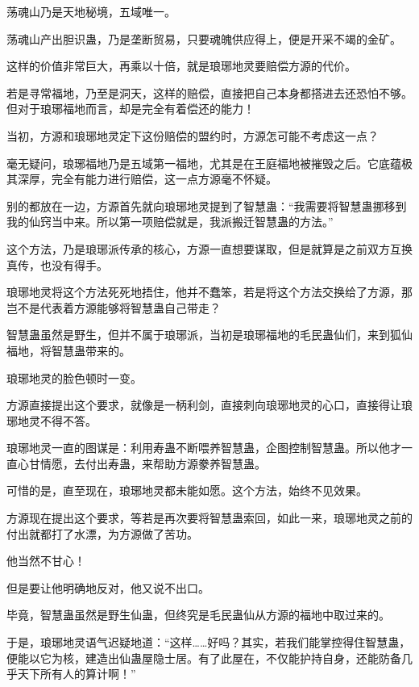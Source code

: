 
\begin{this_body}

荡魂山乃是天地秘境，五域唯一。

荡魂山产出胆识蛊，乃是垄断贸易，只要魂魄供应得上，便是开采不竭的金矿。

这样的价值非常巨大，再乘以十倍，就是琅琊地灵要赔偿方源的代价。

若是寻常福地，乃至是洞天，这样的赔偿，直接把自己本身都搭进去还恐怕不够。但对于琅琊福地而言，却是完全有着偿还的能力！

当初，方源和琅琊地灵定下这份赔偿的盟约时，方源怎可能不考虑这一点？

毫无疑问，琅琊福地乃是五域第一福地，尤其是在王庭福地被摧毁之后。它底蕴极其深厚，完全有能力进行赔偿，这一点方源毫不怀疑。

别的都放在一边，方源首先就向琅琊地灵提到了智慧蛊：“我需要将智慧蛊挪移到我的仙窍当中来。所以第一项赔偿就是，我派搬迁智慧蛊的方法。”

这个方法，乃是琅琊派传承的核心，方源一直想要谋取，但是就算是之前双方互换真传，也没有得手。

琅琊地灵将这个方法死死地捂住，他并不蠢笨，若是将这个方法交换给了方源，那岂不是代表着方源能够将智慧蛊自己带走？

智慧蛊虽然是野生，但并不属于琅琊派，当初是琅琊福地的毛民蛊仙们，来到狐仙福地，将智慧蛊带来的。

琅琊地灵的脸色顿时一变。

方源直接提出这个要求，就像是一柄利剑，直接刺向琅琊地灵的心口，直接得让琅琊地灵不得不答。

琅琊地灵一直的图谋是：利用寿蛊不断喂养智慧蛊，企图控制智慧蛊。所以他才一直心甘情愿，去付出寿蛊，来帮助方源豢养智慧蛊。

可惜的是，直至现在，琅琊地灵都未能如愿。这个方法，始终不见效果。

方源现在提出这个要求，等若是再次要将智慧蛊索回，如此一来，琅琊地灵之前的付出就都打了水漂，为方源做了苦功。

他当然不甘心！

但是要让他明确地反对，他又说不出口。

毕竟，智慧蛊虽然是野生仙蛊，但终究是毛民蛊仙从方源的福地中取过来的。

于是，琅琊地灵语气迟疑地道：“这样……好吗？其实，若我们能掌控得住智慧蛊，便能以它为核，建造出仙蛊屋隐士居。有了此屋在，不仅能护持自身，还能防备几乎天下所有人的算计啊！”


\end{this_body}
